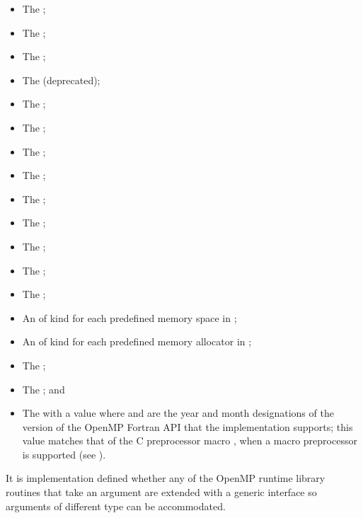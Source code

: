 \begin{fortranspecific}
\begin{itemize}
\item The   ;
\item The   ;
\item The   ;
\item The    (deprecated);
\item The   ;
\item The   ;
\item The   ;
\item The   ;
\item The   ;
\item The   ;
\item The   ;
\item The   ;
\item The   ;
\item An   of kind  
      for each predefined memory space in ;
\item An   of kind  
      for each predefined memory allocator in ;
\item The   ;
\item The   ; and
\item The    with a value 
       where  and  are the year and month designations 
      of the version of the OpenMP Fortran API that the implementation supports; 
      this value matches that of the C preprocessor macro , when a 
      macro preprocessor is supported (see ).
\end{itemize}

It is implementation defined whether any of the OpenMP runtime library 
routines that take an argument are extended with a generic interface so 
arguments of different  type can be accommodated. 
\end{fortranspecific}







